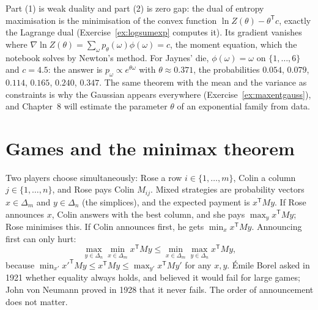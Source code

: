 Part (1) is weak duality and part (2) is zero gap: the dual of entropy maximisation is the minimisation of the convex function $\ln Z(\theta)-\theta^{\mathsf T}c$, exactly the
Lagrange dual (Exercise~\ref{ex:logsumexp} computes it). Its gradient vanishes where $\nabla\ln Z(\theta)=\sum_\omega p_\theta(\omega)\phi(\omega)=c$, the moment equation, which the notebook
solves by Newton's method. For Jaynes' die, $\phi(\omega)=\omega$ on $\{1,\dots,6\}$ and $c=4.5$: the answer is $p_\omega\propto e^{\theta\omega}$ with $\theta\approx0.371$, the probabilities
$0.054$, $0.079$, $0.114$, $0.165$, $0.240$, $0.347$. The same theorem with the mean and the variance as constraints is why the Gaussian appears everywhere
(Exercise~\ref{ex:maxentgauss}), and Chapter~8 will estimate the parameter $\theta$ of an exponential family from data.

\section{Games and the minimax theorem}\label{sec:minimax}

Two players choose simultaneously: Rose a row $i\in\{1,\dots,m\}$, Colin a column $j\in\{1,\dots,n\}$, and Rose pays Colin $M_{ij}$. Mixed strategies are probability vectors
$x\in\Delta_m$ and $y\in\Delta_n$ (the simplices), and the expected payment is $x^{\mathsf T}My$. If Rose announces $x$, Colin answers with the best column, and she pays
$\max_yx^{\mathsf T}My$; Rose minimises this. If Colin announces first, he gets $\min_xx^{\mathsf T}My$. Announcing first can only hurt:
\[
\max_{y\in\Delta_n}\min_{x\in\Delta_m}x^{\mathsf T}My\le\min_{x\in\Delta_m}\max_{y\in\Delta_n}x^{\mathsf T}My,
\]
because $\min_{x'}x'^{\mathsf T}My\le x^{\mathsf T}My\le\max_{y'}x^{\mathsf T}My'$ for any $x,y$. \'Emile Borel asked in 1921 whether equality always holds, and believed it would fail
for large games; John von Neumann proved in 1928 that it never fails. The order of announcement does not matter.

